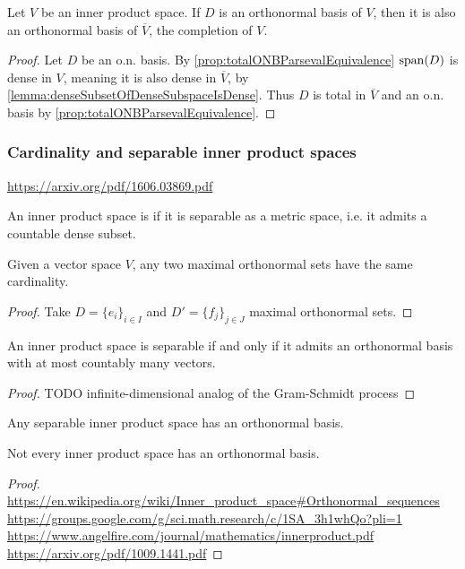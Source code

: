 \begin{lemma}
Let $V$ be an inner product space. If $D$ is an orthonormal basis of $V$, then it is also an orthonormal basis of $\overline{V}$, the completion of $V$.
\end{lemma}
\begin{proof}
Let $D$ be an o.n. basis. By \ref{prop:totalONBParsevalEquivalence} $\operatorname{span}(D)$ is dense in $V$, meaning it is also dense in $\overline{V}$, by \ref{lemma:denseSubsetOfDenseSubspaceIsDense}. Thus $D$ is total in $\overline{V}$ and an o.n. basis by \ref{prop:totalONBParsevalEquivalence}.
\end{proof}

\subsubsection{Cardinality and separable inner product spaces}
\url{https://arxiv.org/pdf/1606.03869.pdf}
\begin{definition}
An inner product space is  if it is separable as a metric space, i.e. it admits a countable dense subset.
\end{definition}

\begin{proposition}
Given a vector space $V$, any two maximal orthonormal sets have the same cardinality.
\end{proposition}
\begin{proof}
Take $D = \{e_i\}_{i\in I}$ and $D' = \{f_j\}_{j\in J}$ maximal orthonormal sets.
\end{proof}

\begin{proposition}
An inner product space is separable \textup{if and only if} it admits an orthonormal basis with at most countably many vectors.
\end{proposition}
\begin{proof}
TODO infinite-dimensional analog of the Gram-Schmidt process
\end{proof}
\begin{corollary}
Any separable inner product space has an orthonormal basis.
\end{corollary}

\begin{proposition}
Not every inner product space has an orthonormal basis.
\end{proposition}
\begin{proof}
\url{https://en.wikipedia.org/wiki/Inner_product_space#Orthonormal_sequences}
\url{https://groups.google.com/g/sci.math.research/c/1SA_3h1whQo?pli=1}
\url{https://www.angelfire.com/journal/mathematics/innerproduct.pdf}
\url{https://arxiv.org/pdf/1009.1441.pdf}
\end{proof}


